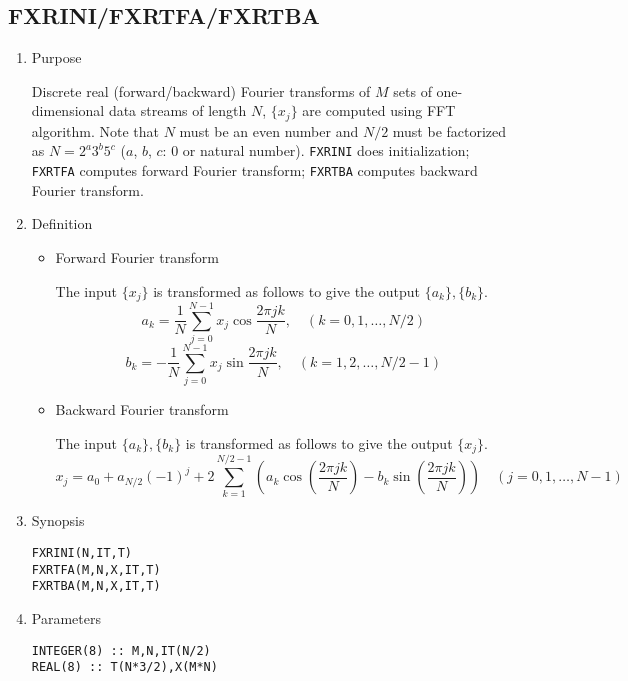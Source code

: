 \documentclass[a4paper]{scrartcl}
\begin{document}
\subsection{FXRINI/FXRTFA/FXRTBA}
\begin{enumerate}
  \item Purpose 

   Discrete real (forward/backward) Fourier transforms of $M$ sets of 
  one-dimensional data streams of length $N$, 
$\{x_j\}$ are computed using FFT algorithm.
  Note that $N$ must be an even number and $N/2$ 
must be factorized as
$N=2^a3^b5^c$ ($a$, $b$, $c$: 0 or natural number).
     \texttt{FXRINI} does initialization;
     \texttt{FXRTFA} computes forward Fourier transform;
     \texttt{FXRTBA} computes backward Fourier transform.

  \item Definition
    \begin{itemize}
     \item Forward Fourier transform

       The input $\{x_j\}$ is transformed as follows to give 
       the output $\{a_k\},\{b_k\}$.
       \[
       a_k= \frac1N\sum^{N-1}_{j=0}x_j\cos\frac{2\pi jk}N,
       \quad (k=0,1,\ldots,N/2)
       \]
       \[
       b_k=-\frac1N\sum^{N-1}_{j=0}x_j\sin\frac{2\pi jk}N,
       \quad (k=1,2,\ldots,N/2-1)
       \]

     \item Backward Fourier transform

       The input $\{a_k\},\{b_k\}$ is transformed as follows to give 
       the output $\{x_j\}$.
       \[
       x_j=a_0+a_{N/2}(-1)^j+2\sum^{N/2-1}_{k=1}
       \left(a_k\cos\left(\frac{2\pi jk}N\right)
                          -b_k\sin\left(\frac{2\pi jk}N\right)\right)
       \quad (j=0,1,\ldots,N-1)
      \]
     \end{itemize}    
  \item Synopsis 

    \texttt{FXRINI(N,IT,T)}\\
    \texttt{FXRTFA(M,N,X,IT,T)}\\
    \texttt{FXRTBA(M,N,X,IT,T)}

  \item Parameters

     \vspace{-2ex}    
    
     \begin{verbatim}
INTEGER(8) :: M,N,IT(N/2)
REAL(8) :: T(N*3/2),X(M*N)
\end{verbatim}
     

\end{enumerate}
\end{document}
